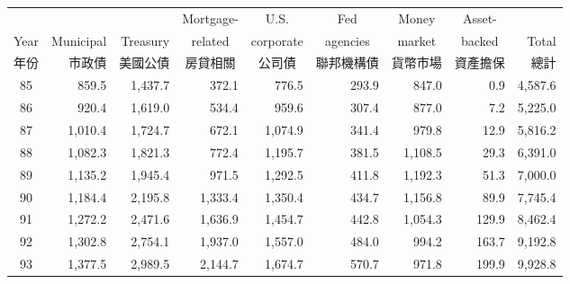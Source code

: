 \newcommand{\zhcell}[1]{{\scriptsize\textcolor{black!55}{#1}}}
\begin{table}[H]
	\centering
	\footnotesize
	\setlength{\tabcolsep}{4pt}
	\begin{tabular}{c rrrrrrr r}
		\toprule
		     &           &          & \multicolumn{1}{c}{Mortgage-} & \multicolumn{1}{c}{U.S.}
		     & \multicolumn{1}{c}{Fed} & \multicolumn{1}{c}{Money} & \multicolumn{1}{c}{Asset-} &          \\
		Year & Municipal & Treasury & \multicolumn{1}{c}{related} & \multicolumn{1}{c}{corporate}
		     & \multicolumn{1}{c}{agencies} & \multicolumn{1}{c}{market} & \multicolumn{1}{c}{backed} & Total \\
		\zhcell{年份} & \zhcell{市政債} & \zhcell{美國公債}
		     & \multicolumn{1}{c}{\zhcell{房貸相關}} & \multicolumn{1}{c}{\zhcell{公司債}}
		     & \multicolumn{1}{c}{\zhcell{聯邦機構債}} & \multicolumn{1}{c}{\zhcell{貨幣市場}}
		     & \multicolumn{1}{c}{\zhcell{資產擔保}} & \zhcell{總計} \\
		\midrule
		85   & 859.5     & 1,437.7  & 372.1                                                       & 776.5    & 293.9   & 847.0    & 0.9     & 4,587.6  \\
		86   & 920.4     & 1,619.0  & 534.4                                                       & 959.6    & 307.4   & 877.0    & 7.2     & 5,225.0  \\
		87   & 1,010.4   & 1,724.7  & 672.1                                                       & 1,074.9  & 341.4   & 979.8    & 12.9    & 5,816.2  \\
		88   & 1,082.3   & 1,821.3  & 772.4                                                       & 1,195.7  & 381.5   & 1,108.5  & 29.3    & 6,391.0  \\
		89   & 1,135.2   & 1,945.4  & 971.5                                                       & 1,292.5  & 411.8   & 1,192.3  & 51.3    & 7,000.0  \\
		90   & 1,184.4   & 2,195.8  & 1,333.4                                                     & 1,350.4  & 434.7   & 1,156.8  & 89.9    & 7,745.4  \\
		91   & 1,272.2   & 2,471.6  & 1,636.9                                                     & 1,454.7  & 442.8   & 1,054.3  & 129.9   & 8,462.4  \\
		92   & 1,302.8   & 2,754.1  & 1,937.0                                                     & 1,557.0  & 484.0   & 994.2    & 163.7   & 9,192.8  \\
		93   & 1,377.5   & 2,989.5  & 2,144.7                                                     & 1,674.7  & 570.7   & 971.8    & 199.9   & 9,928.8  \\

\end{tabular}
\end{table}
